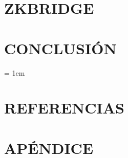 \documentclass[12pt, oneside]{book}
\begin{document}
\chapter{ZKBRIDGE}
\thispagestyle{empty}







\chapter{CONCLUSIÓN} \label{chp:conclusion}
\thispagestyle{empty}



\chapterformattitleonly

\emergencystretch = 1em
\chapter*{REFERENCIAS}
\printbibliography[heading=none]

\appendix
\chapter*{APÉNDICE}
\renewcommand{\thechapter}{A}


\printindex

%
\end{document}
